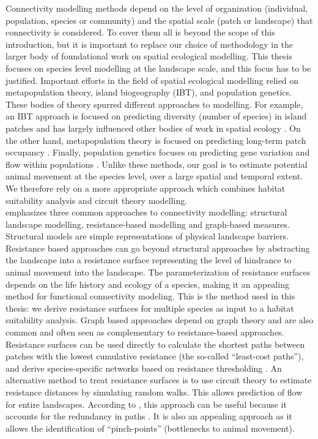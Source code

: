 \documentclass[12pt,Bold,TexShade]{thesis/mcgilletdclass}
\begin{document}
{Connectivity modelling methods depend on the level of organization (individual, population, species or community) and the spatial scale (patch or  landscape) that connectivity is considered. To cover them all is beyond the scope of this introduction, but it is important to replace our choice of methodology in the larger body of foundational work on spatial ecological modelling. This thesis focuses on species level modelling at the landscape scale, and this focus has to be justified. Important efforts in the field of spatial ecological modelling relied on metapopulation theory, island biogeography (IBT), and population genetics. These bodies of theory spurred different approaches to modelling. For example, an IBT approach is focused on predicting diversity (number of species) in island patches \citep{macarthur_theory_1967} and has largely influenced other bodies of work in spatial ecology \citep{warren_how_2020}. On the other hand, metapopulation theory is focused on predicting long-term patch occupancy \citep{hanski_habitat_1999, hanski_metapopulation_2000}. Finally, population genetics focuses on predicting gene variation and flow within populations \citep{lewontin_population_1985, charlesworth_population_2017}. Unlike these methods, our goal is to estimate potential animal movement at the species level, over a large spatial and temporal extent. We therefore rely on a more appropriate approach which combines habitat suitability analysis and circuit theory modelling.\\

\cite{fletcher_spatial_2018} emphasizes three common approaches to connectivity modelling: structural landscape modelling, resistance-based modelling and graph-based measures. Structural models are simple representations of physical landscape barriers. Resistance based approaches can go beyond structural approaches by abstracting the landscape into a resistance surface representing the level of hindrance to animal movement into the landscape. The parameterization of resistance surfaces depends on the life history and ecology of a species, making it an appealing method for functional connectivity modeling.  This is the method used in this thesis: we derive resistance surfaces for multiple species as input to a habitat suitability analysis. Graph based approaches depend on graph theory and are also common and often seen as complementary to resistance-based approaches. \\

Resistance surfaces can be used directly to calculate the shortest paths between patches with the lowest cumulative resistance (the so-called “least-cost paths”), and derive species-specific networks based on resistance thresholding \citep{lechner_characterising_2017}. An alternative method to treat resistance surfaces is to use circuit theory to estimate resistance distances by simulating random walks. This allows prediction of flow for entire landscapes. According to \cite{fletcher_spatial_2018}, this approach can be useful because it accounts for the redundancy in paths \cite{mcrae_isolation_2006, mcrae_mcrae_2008}. It is also an appealing approach as it allows the identification of “pinch-points” (bottlenecks to animal movement). \\

}
\end{document}
